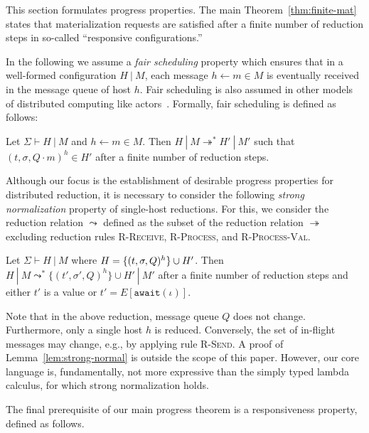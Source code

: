 This section formulates progress properties. The main
Theorem~\ref{thm:finite-mat} states that materialization requests are
satisfied after a finite number of reduction steps in so-called
``responsive configurations.''

In the following we assume a {\em fair scheduling} property which
ensures that in a well-formed configuration $H~|~M$, each message $h
\leftarrow m \in M$ is eventually received in the message queue of
host $h$. Fair scheduling is also assumed in other models of
distributed computing like actors~\cite{Actors,Talcott}. Formally,
fair scheduling is defined as follows:

\begin{defn}\label{def:fair-scheduling}
  Let $\Sigma \vdash H~|~M$ and $h \leftarrow m \in M$. Then $H~|~M
  \twoheadrightarrow^* H'~|~M'$ such that $(t, \sigma, Q \cdot m)^h \in
  H'$ after a finite number of reduction steps.
\end{defn}

Although our focus is the establishment of desirable progress
properties for distributed reduction, it is necessary to consider the
following {\em strong normalization} property of single-host
reductions. For this, we consider the reduction relation $\leadsto$
defined as the subset of the reduction relation $\twoheadrightarrow$
excluding reduction rules \textsc{R-Receive}, \textsc{R-Process}, and
\textsc{R-Process-Val}.

\begin{lem}\label{lem:strong-normal}
  Let $\Sigma \vdash H~|~M$ where $H = \\ \{ (t, \sigma, Q)^h \} \cup
  H'$. Then $H~|~M \leadsto^* \{ (t', \sigma', Q)^h \} \cup H'~|~M'$
  after a finite number of reduction steps and either $t'$ is a value
  or $t' = E[\texttt{await}(\iota)]$.
\end{lem}

Note that in the above reduction, message queue $Q$ does not
change. Furthermore, only a single host $h$ is reduced. Conversely,
the set of in-flight messages may change, e.g., by applying rule
\textsc{R-Send}. A proof of Lemma~\ref{lem:strong-normal} is outside
the scope of this paper. However, our core language is, fundamentally,
not more expressive than the simply typed lambda calculus, for which
strong normalization holds.

The final prerequisite of our main progress theorem is a
responsiveness property, defined as follows.

